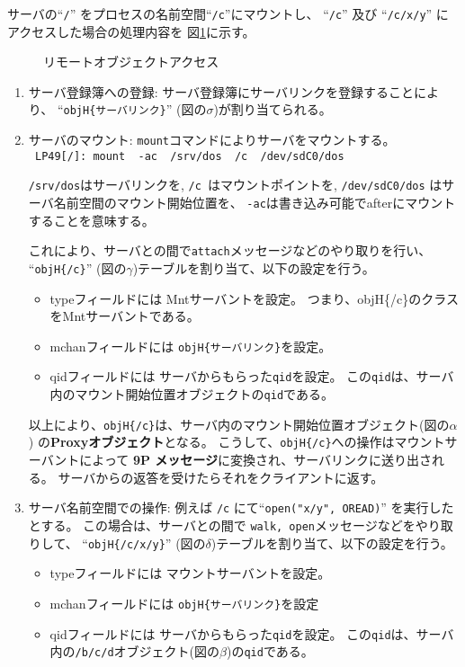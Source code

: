 \documentclass{ipsjpapers}
\begin{document}
 サーバの``{\tt /}'' をプロセスの名前空間``{\tt /c}''にマウントし、
``{\tt /c}'' 及び ``{\tt /c/x/y}''  にアクセスした場合の処理内容を
図\ref{fig:RemoteAccess}に示す。

\begin{figure}[htb]
  \begin{center}
   \epsfxsize=340pt
    \caption{リモートオブジェクトアクセス}
    \label{fig:RemoteAccess}
  \end{center}
\end{figure}


\begin{enumerate}
\item サーバ登録簿への登録:  
  サーバ登録簿にサーバリンクを登録することにより、
  ``{\tt objH\{サーバリンク\}}'' (図の$\sigma$)が割り当てられる。

\item サーバのマウント: 
   {\tt mount}コマンドによりサーバをマウントする。\\
   \verb| LP49[/]: mount  -ac  /srv/dos  /c  /dev/sdC0/dos|

   {\tt /srv/dos}はサーバリンクを,
   {\tt /c }はマウントポイントを,
   {\tt /dev/sdC0/dos} はサーバ名前空間のマウント開始位置を、
   {\tt -ac}は書き込み可能でafterにマウントすることを意味する。  

  これにより、サーバとの間で{\tt attach}メッセージなどのやり取りを行い、
  ``{\tt objH\{/c\}}'' (図の$\gamma$)テーブルを割り当て、以下の設定を行う。
  \begin{itemize}
    \item  typeフィールドには Mntサーバントを設定。
          つまり、objH\{/c\}のクラスをMntサーバントである。
    \item  mchanフィールドには {\tt objH\{サーバリンク\}}を設定。
    \item  qidフィールドには サーバからもらった{\tt qid}を設定。
          この{\tt qid}は、サーバ内のマウント開始位置オブジェクトの{\tt qid}である。
  \end{itemize}
  
    以上により、{\tt objH\{/c\}}は、サーバ内のマウント開始位置オブジェクト(図の$\alpha$)
    の{\bf Proxyオブジェクト}となる。
    こうして、{\tt objH\{/c\}}への操作はマウントサーバントによって
    {\bf 9P メッセージ}に変換され、サーバリンクに送り出される。
   サーバからの返答を受けたらそれをクライアントに返す。

\item サーバ名前空間での操作:  
   例えば {\tt /c} にて``{\tt open("x/y", OREAD)}'' を実行したとする。
   この場合は、サーバとの間で {\tt walk, open}メッセージなどをやり取りして、
   ``{\tt objH\{/c/x/y\}}'' (図の$\delta$)テーブルを割り当て、以下の設定を行う。
  \begin{itemize}
    \item  typeフィールドには マウントサーバントを設定。
    \item  mchanフィールドには {\tt objH\{サーバリンク\}}を設定
    \item  qidフィールドには サーバからもらった{\tt qid}を設定。
       この{\tt qid}は、サーバ内の{\tt /b/c/d}オブジェクト(図の$\beta$)の{\tt qid}である。
  \end{itemize}


\end{enumerate}
\end{document}
